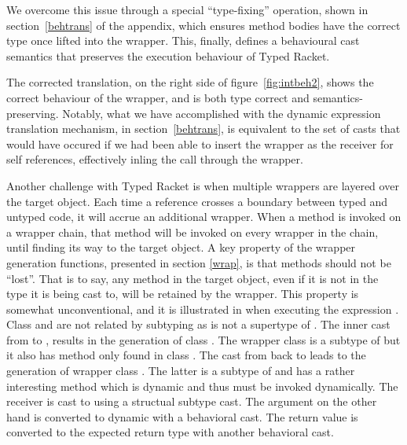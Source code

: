 \documentclass[a4paper,USenglish]{tex/lipics-v2016}
\begin{document}
We overcome this issue through a special ``type-fixing'' operation, shown in
section~\ref{behtrans} of the appendix, which ensures method bodies have the correct type 
once lifted into the wrapper. This, finally, defines a behavioural cast semantics 
that preserves the execution behaviour of Typed Racket.

The corrected translation, on the right side of
figure~\ref{fig:intbeh2}, shows the correct behaviour of the wrapper, and
is both type correct and semantics-preserving. Notably, what we have
accomplished with the dynamic expression translation mechanism, in
section~\ref{behtrans}, is equivalent to the set of casts that would have occured
if we had been able to insert the wrapper as the receiver for self references,
effectively inling the call through the wrapper.

Another challenge with Typed Racket is when multiple wrappers are layered 
over the target object. Each time a reference crosses a boundary between typed and untyped code,
it will accrue an additional wrapper. When a method is invoked on a wrapper
chain, that method will be invoked on every wrapper in the chain, until finding its way to
the target object. A key property of the wrapper generation functions, presented in section
\ref{wrap}, is that methods should not be ``lost''. That is to say, any method
in the target object, even if it is not in the type it is being cast to, will be
retained by the wrapper.  This property is somewhat unconventional, and it is 
illustrated in  when executing the expression \BehCast\C{(\BehCast\D{\New\C{}})}. 
Class \C and \D are not related by subtyping as \any is not a supertype of \E. The inner cast from \C to
\D, results in the generation of class . The wrapper class is a
subtype of \D but it also has method \mp only found in class \C.  The cast from
 back to \C leads to the generation of wrapper class .
The latter is a subtype of \C and has a rather interesting method \m which is
dynamic and thus must be invoked dynamically. The receiver is cast to \any using
a structual subtype cast. The argument on the other hand is converted to dynamic with a
behavioral cast. The return value is converted to the expected return type with
another behavioral cast.
\end{document}
